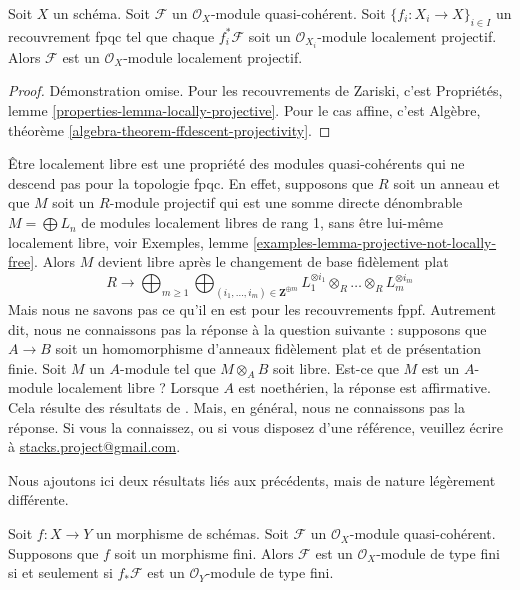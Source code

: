 \begin{lemma}
\label{lemma-locally-projective-descends}
Soit $X$ un schéma.
Soit $\mathcal{F}$ un $\mathcal{O}_X$-module quasi-cohérent.
Soit $\{f_i : X_i \to X\}_{i \in I}$ un recouvrement fpqc tel que
chaque $f_i^*\mathcal{F}$ soit un $\mathcal{O}_{X_i}$-module localement projectif.
Alors $\mathcal{F}$ est un $\mathcal{O}_X$-module localement projectif.
\end{lemma}

\begin{proof}
Démonstration omise. Pour les recouvrements de Zariski, c'est
Propriétés, lemme \ref{properties-lemma-locally-projective}.
Pour le cas affine, c'est
Algèbre, théorème \ref{algebra-theorem-ffdescent-projectivity}.
\end{proof}

\begin{remark}
\label{remark-locally-free-descends}
Être localement libre est une propriété des modules quasi-cohérents qui
ne descend pas pour la topologie fpqc. En effet, supposons que
$R$ soit un anneau et que $M$ soit un $R$-module projectif qui est
une somme directe dénombrable $M = \bigoplus L_n$ de modules localement
libres de rang 1, sans être lui-même localement libre, voir
Exemples, lemme \ref{examples-lemma-projective-not-locally-free}.
Alors $M$ devient libre après le changement de base fidèlement plat
$$
R \longrightarrow
\bigoplus\nolimits_{m \geq 1}
\bigoplus\nolimits_{(i_1, \ldots, i_m) \in \mathbf{Z}^{\oplus m}}
L_1^{\otimes i_1} \otimes_R \ldots \otimes_R L_m^{\otimes i_m}
$$
Mais nous ne savons pas ce qu'il en est pour les recouvrements fppf.
Autrement dit, nous ne connaissons pas la réponse à la question suivante :
supposons que $A \to B$ soit un homomorphisme d'anneaux fidèlement
plat et de présentation finie. Soit $M$ un $A$-module
tel que $M \otimes_A B$ soit libre. Est-ce que $M$ est un
$A$-module localement libre ? Lorsque $A$ est noethérien, la réponse
est affirmative. Cela résulte des résultats de \cite{Bass}. Mais, en général,
nous ne connaissons pas la réponse. Si vous la connaissez, ou si vous disposez
d'une référence, veuillez écrire à
\href{mailto:stacks.project@gmail.com}{stacks.project@gmail.com}.
\end{remark}

\noindent
Nous ajoutons ici deux résultats liés aux précédents, mais de nature
légèrement différente.

\begin{lemma}
\label{lemma-finite-over-finite-module}
Soit $f : X \to Y$ un morphisme de schémas.
Soit $\mathcal{F}$ un $\mathcal{O}_X$-module quasi-cohérent.
Supposons que $f$ soit un morphisme fini.
Alors $\mathcal{F}$ est un $\mathcal{O}_X$-module de type fini
si et seulement si $f_*\mathcal{F}$ est un $\mathcal{O}_Y$-module de type
fini.
\end{lemma}

